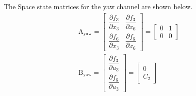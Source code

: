 \documentclass[conference]{IEEEtran}
\begin{document}
The Space state matrices for the yaw channel are shown below.
\begin{equation}
	\begin{split}
		&\boldsymbol{\mathrm{A}}_{\text{yaw}} = \begin{bmatrix}
			\dfrac{\partial  f_3}{\partial  x_3}& \dfrac{\partial  f_3}{\partial  x_6}
			\\[1em]
			\dfrac{\partial  f_6}{\partial  x_3}& \dfrac{\partial  f_6}{\partial  x_6}
		\end{bmatrix} = 
		\begin{bmatrix}
			0 & 1\\
			0 & 0
		\end{bmatrix}
	\\[1em]
	&\boldsymbol{\mathrm{B}}_{\text{yaw}} = \begin{bmatrix}
		\dfrac{\partial  f_3}{\partial  u_3}
		\\[1em]
		\dfrac{\partial  f_6}{\partial  u_3}
	\end{bmatrix} = 
	\begin{bmatrix}
		0\\
		C_2
	\end{bmatrix}
\end{split}
\end{equation}



\end{document}
